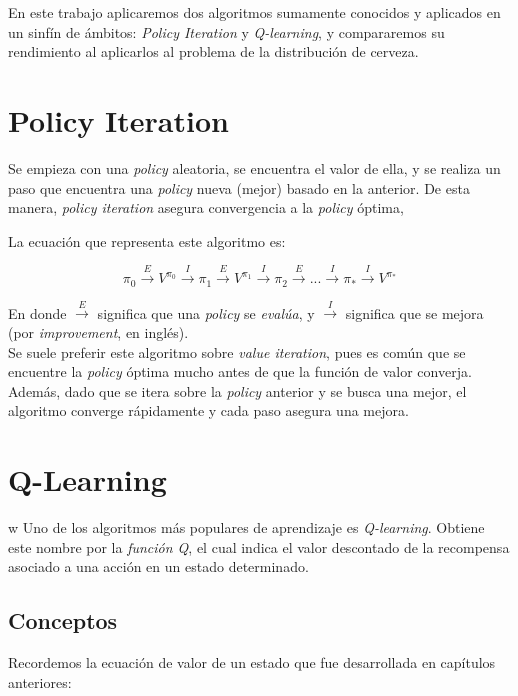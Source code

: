 En este trabajo aplicaremos dos algoritmos sumamente conocidos y aplicados en un sinf\'in de \'ambitos: \textit{Policy Iteration} y \textit{Q-learning}, y compararemos su rendimiento al aplicarlos al problema de la distribuci\'on de cerveza.

\section{Policy Iteration}

Se empieza con una \textit{policy} aleatoria, se encuentra el valor de ella, y se realiza un paso que encuentra una \textit{policy} nueva (mejor) basado en la anterior. De esta manera, \textit{policy iteration} asegura convergencia a la \textit{policy} \'optima, 

La ecuaci\'on que representa este algoritmo es:

$$
\pi_0 \overset{E}{\rightarrow} V^{\pi_{0}} \overset{I}{\rightarrow}
\pi_1 \overset{E}{\rightarrow} V^{\pi_{1}} \overset{I}{\rightarrow}
\pi_2 \overset{E}{\rightarrow} 
...
\overset{I}{\rightarrow} \pi_{*} \overset{I}{\rightarrow} V^{\pi_{*}}
$$

En donde $\overset{E}{\rightarrow}$ significa que una \textit{policy} se \textit{eval\'ua}, y $\overset{I}{\rightarrow}$ significa que se mejora (por \textit{improvement}, en ingl\'es). \\

Se suele preferir este algoritmo sobre \textit{value iteration}, pues es com\'un que se encuentre la \textit{policy} \'optima mucho antes de que la funci\'on de valor converja. Adem\'as, dado que se itera sobre la \textit{policy} anterior y se busca una mejor, el algoritmo converge r\'apidamente y cada paso asegura una mejora.

\section{Q-Learning}
w
Uno de los algoritmos m\'as populares de aprendizaje es \textit{Q-learning}. Obtiene este nombre por la \textit{funci\'on Q}, el cual indica el valor descontado de la recompensa asociado a una acci\'on en un estado determinado.

\subsection{Conceptos}

Recordemos la ecuaci\'on de valor de un estado que fue desarrollada en cap\'itulos anteriores:

